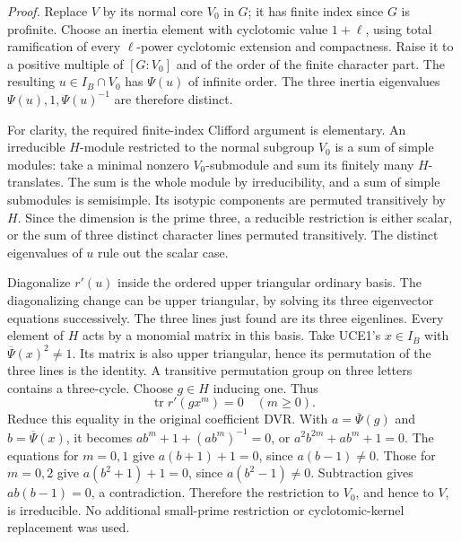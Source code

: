 \emph{Proof.}
Replace \(V\) by its normal core \(V_0\) in \(G\); it
has finite index since \(G\) is profinite.  Choose an inertia
element with cyclotomic value \(1+\ell\), using total ramification
of every \(\ell\)-power cyclotomic extension and compactness.
Raise it to a positive multiple of \([G:V_0]\) and of the
order of the finite character part.  The resulting
\(u\in I_B\cap V_0\) has \(\Psi(u)\) of infinite order.
The three inertia eigenvalues \(\Psi(u),1,\Psi(u)^{-1}\)
are therefore distinct.

For clarity, the required finite-index Clifford argument is
elementary.  An irreducible \(H\)-module restricted to the normal
subgroup \(V_0\) is a sum of simple modules: take a minimal
nonzero \(V_0\)-submodule and sum its finitely many \(H\)-translates.
The sum is the whole module by irreducibility, and a sum of simple
submodules is semisimple.  Its isotypic components are permuted
transitively by \(H\).  Since the dimension is the prime three,
a reducible restriction is either scalar, or the sum of three
distinct character lines permuted transitively.  The distinct
eigenvalues of \(u\) rule out the scalar case.

Diagonalize \(r'(u)\) inside the ordered upper triangular
ordinary basis.  The diagonalizing change can be upper triangular,
by solving its three eigenvector equations successively.  The
three lines just found are its three eigenlines.  Every element
of \(H\) acts by a monomial matrix in this basis.
Take UCE1's \(x\in I_B\) with
\(\overline\Psi(x)^2\ne1\).  Its matrix is also upper
triangular, hence its permutation of the three lines is the
identity.  A transitive permutation group on three letters contains
a three-cycle.  Choose \(g\in H\) inducing one.  Thus
\[
                        \operatorname{tr}r'(gx^m)=0
                                      \quad(m\ge0).
 \tag{UCE.13}
\]
Reduce this equality in the original coefficient DVR.  With
\(a=\overline\Psi(g)\) and \(b=\overline\Psi(x)\), it becomes
\(ab^m+1+(ab^m)^{-1}=0\), or
\(a^2b^{2m}+ab^m+1=0\).  The equations for \(m=0,1\)
give \(a(b+1)+1=0\), since \(a(b-1)\ne0\).
Those for \(m=0,2\) give \(a(b^2+1)+1=0\), since
\(a(b^2-1)\ne0\).  Subtraction gives
\(ab(b-1)=0\), a contradiction.  Therefore the restriction
to \(V_0\), and hence to \(V\), is irreducible.
No additional small-prime restriction or cyclotomic-kernel
replacement was used.

